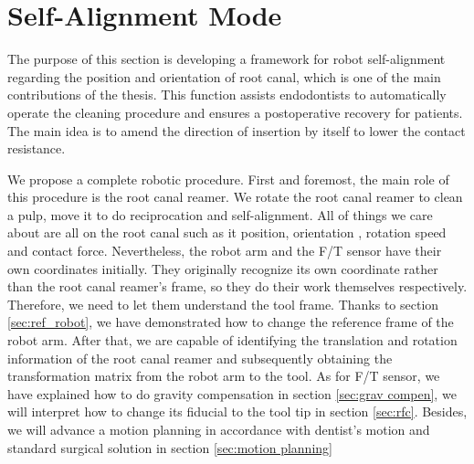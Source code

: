 \section{Self-Alignment Mode}
The purpose of this section is developing a framework for robot self-alignment regarding the position and orientation of root canal, which is one of the main contributions of the thesis. This function assists endodontists to automatically operate the cleaning procedure and ensures a postoperative recovery for patients. The main idea is to amend the direction of insertion by itself to lower the contact resistance.
\par
We propose a complete robotic procedure. First and foremost, the main role of this procedure is the root canal reamer. We rotate the root canal reamer to clean a pulp, move it to do reciprocation and self-alignment. All of things we care about are all on the root canal such as it position, orientation , rotation speed and contact force. Nevertheless, the robot arm and the F/T sensor have their own coordinates initially. They originally recognize its own coordinate rather than the root canal reamer's frame, so they do their work themselves respectively. Therefore, we need to let them understand the tool frame. Thanks to section \ref{sec:ref_robot}, we have demonstrated how to change the reference frame of the robot arm. After that, we are capable of identifying the translation and rotation information of the root canal reamer and subsequently obtaining the transformation matrix from the robot arm to the tool. As for F/T sensor, we have explained how to do gravity compensation in section \ref{sec:grav compen}, we will interpret how to change its fiducial to the tool tip in section \ref{sec:rfc}. Besides, we will advance a motion planning in accordance with dentist's motion and standard surgical solution in section \ref{sec:motion planning} 
